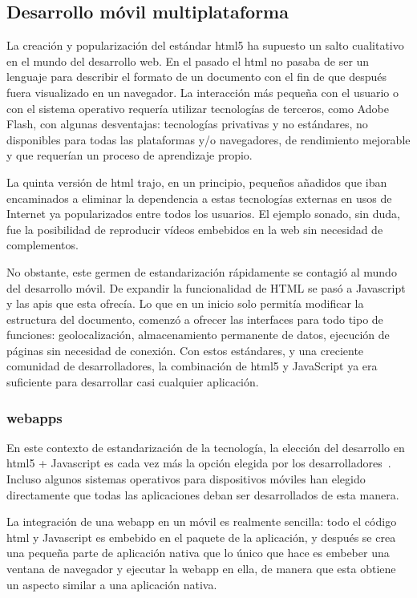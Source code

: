 \documentclass[main]{subfiles}
\begin{document}
\subsection{Desarrollo móvil multiplataforma}

La creación y popularización del estándar \gls{html5} ha supuesto un salto cualitativo en el mundo del desarrollo web. En el pasado el \gls{html} no pasaba de ser un lenguaje para describir el formato de un documento con el fin de que después fuera visualizado en un navegador. La interacción más pequeña con el usuario o con el sistema operativo requería utilizar tecnologías de terceros, como Adobe Flash, con algunas desventajas: tecnologías privativas y no estándares, no disponibles para todas las plataformas y/o navegadores, de rendimiento mejorable y que requerían un proceso de aprendizaje propio.

La quinta versión de \gls{html} trajo, en un principio, pequeños añadidos que iban encaminados a eliminar la dependencia a estas tecnologías externas en usos de Internet ya popularizados entre todos los usuarios. El ejemplo sonado, sin duda,  fue la posibilidad de reproducir vídeos embebidos en la web sin necesidad de complementos.

No obstante, este germen de estandarización rápidamente se contagió al mundo del desarrollo móvil. De expandir la funcionalidad de HTML se pasó a Javascript y las \glspl{api} que esta ofrecía. Lo que en un inicio solo permitía modificar la estructura del documento, comenzó a ofrecer las interfaces para todo tipo de funciones: geolocalización, almacenamiento permanente de datos, ejecución de páginas sin necesidad de conexión. Con estos estándares, y una creciente comunidad de desarrolladores, la combinación de \gls{html5} y JavaScript ya era suficiente para desarrollar casi cualquier aplicación.

\subsubsection[Webapp]{\Glspl{webapp}}
En este contexto de estandarización de la tecnología, la elección del desarrollo en \gls{html5} + Javascript es cada vez más la opción elegida por los desarrolladores~\autocite{ibaivalencia}. Incluso algunos sistemas operativos para dispositivos móviles han elegido directamente que todas las aplicaciones deban ser desarrollados de esta manera.

La integración de una \gls{webapp} en un móvil es realmente sencilla: todo el código \gls{html} y Javascript es embebido en el paquete de la aplicación, y después se crea una pequeña parte de aplicación nativa que lo único que hace es embeber una ventana de navegador y ejecutar la \gls{webapp} en ella, de manera que esta obtiene un aspecto similar a una aplicación nativa.
\end{document}
